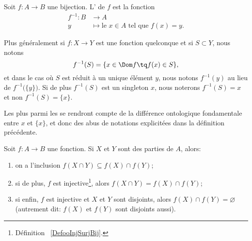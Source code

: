 \begin{definition}      \label{DEFooTRGYooRxORpY}
	Soit \( f\colon A\to B\) une bijection. L' de \( f\) est la fonction
	\begin{equation}
		\begin{aligned}
			f^{-1}\colon B & \to A                                             \\
			y              & \mapsto \text{le } x\in A\text{ tel que } f(x)=y.
		\end{aligned}
	\end{equation}

	Plus généralement si \( f\colon X\to Y\) est une fonction quelconque et si \( S\subset Y\), nous notons
	\begin{equation}
		f^{-1}(S)=\{ x\in \Dom f \tq f(x)\in S \},
	\end{equation}
	et dans le cas où \( S\) est réduit à un unique élément \( y\), nous notons \( f^{-1}(y)\) au lieu de \( f^{-1}\big( \{ y \} \big)\). Si de plus \( f^{-1}(S)\) est un singleton \( x\), nous noterons \( f^{-1}(S)=x\) et non \( f^{-1}(S)=\{ x \}\).
\end{definition}

\begin{remark}	\label{REMooDifferenceElementSingleton}
	Les plus  parmi les  se rendront compte de la différence ontologique fondamentale entre \( x\) et \( \{ x \}\), et donc des abus de notations explicitées dans la définition précédente.
\end{remark}

\begin{proposition}		\label{PROPooBXVSooZXmwKC}
	Soit \(f \colon A\to B  \) une fonction. Si \( X\) et \( Y\) sont des parties de \( A\), alors:
	\begin{enumerate}
		\item \label{ITEMooFctInclusionInter}
		      on a l'inclusion \( f(X\cap Y) \subseteq f(X)\cap f(Y)\);
		\item \label{ITEMooFctInjEgaliteInter}
		      si de plus, \( f \) est  injective\footnote{Définition~ \ref{DefooInjSurjBij}.}, alors \( f(X\cap Y)=f(X)\cap f(Y)\);
		\item \label{ITEMooFctInjDisjonction}
		      si enfin, \( f \) est injective et \( X\) et \( Y\) sont disjoints, alors \( f(X)\cap f(Y) = \varnothing \) (autrement dit:  \( f(X) \) et \( f(Y) \) sont disjoints aussi).
	\end{enumerate}
\end{proposition}

